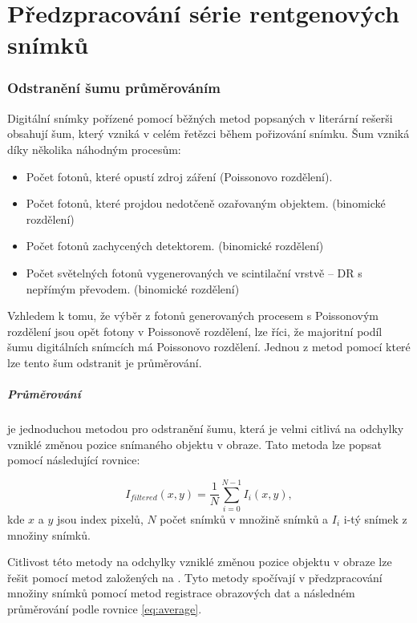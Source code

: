 \chapter{Předzpracování série rentgenových snímků}

\subsection{Odstranění šumu průměrováním}
Digitální snímky pořízené pomocí běžných metod popsaných v literární rešerši obsahují šum, který vzniká v celém řetězci během pořizování snímku. Šum vzniká díky několika náhodným procesům:
\begin{itemize}
\item Počet fotonů, které opustí zdroj záření (Poissonovo rozdělení).
\item Počet fotonů, které projdou nedotčeně ozařovaným objektem. (binomické rozdělení)
\item Počet fotonů zachycených detektorem. (binomické rozdělení)
\item Počet světelných fotonů vygenerovaných ve scintilační vrstvě -- DR s nepřímým převodem. (binomické rozdělení)
\end{itemize}

Vzhledem k tomu, že výběr z fotonů generovaných procesem s Poissonovým rozdělení jsou opět fotony v Poissonově rozdělení, lze říci, že majoritní podíl šumu  digitálních snímcích má Poissonovo rozdělení. \cite{X-ray-imaging-noise-and-SNR} Jednou z metod pomocí které lze tento šum odstranit je průměrování.

\paragraph{Průměrování}
je jednoduchou metodou pro odstranění šumu, která je velmi citlivá na odchylky vzniklé změnou pozice snímaného objektu v obraze. Tato metoda lze popsat pomocí následující rovnice:

\begin{equation}
\label{eq:average}
I_{filtered} \left( x,y \right ) = \frac{1}{N} \sum_{i = 0}^{N - 1}I_{i}\left( x,y \right ),
\end{equation}
kde $x$ a $y$ jsou index pixelů, $N$ počet snímků v množině snímků a $I_{i}$ i-tý snímek z množiny snímků.

Citlivost této metody na odchylky vzniklé změnou pozice objektu v obraze lze řešit pomocí metod založených na . Tyto metody spočívají v předzpracování množiny snímků pomocí metod registrace obrazových dat a následném průměrování podle rovnice \ref{eq:average}.

